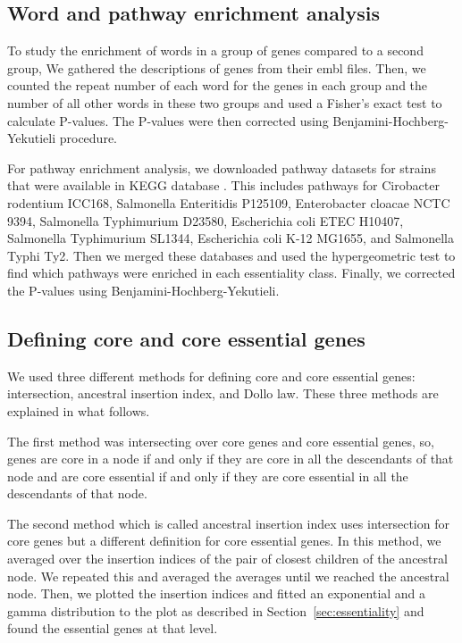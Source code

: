 \documentclass[12pt,letterpaper]{article}
\begin{document}
\subsection{Word and pathway enrichment analysis}\label{sec:enrichment}
To study the enrichment of words in a group of genes compared to a second group, We gathered the descriptions of genes from their embl files. Then, we counted the repeat number of each word for the genes in each group and the number of all other words in these two groups and used a Fisher's exact test to calculate P-values. The P-values were then corrected using Benjamini-Hochberg-Yekutieli procedure.

For pathway enrichment analysis, we downloaded pathway datasets for strains that were available in KEGG database \cite{kanehisa_kegg:_2000}. This includes pathways for Cirobacter rodentium ICC168, Salmonella Enteritidis P125109, Enterobacter cloacae NCTC 9394, Salmonella Typhimurium D23580, Escherichia coli ETEC H10407, Salmonella Typhimurium SL1344, Escherichia coli K-12 MG1655, and Salmonella Typhi Ty2. Then we merged these databases and used the hypergeometric test to find which pathways were enriched in each essentiality class. Finally, we corrected the P-values using Benjamini-Hochberg-Yekutieli.

\subsection{Defining core and core essential genes}\label{sec:core}
We used three different methods for defining core and core essential genes: intersection, ancestral insertion index, and Dollo law. These three methods are explained in what follows.

The first method was intersecting over core genes and core essential genes, so, genes are core in a node if and only if they are core in all the descendants of that node and are core essential if and only if they are core essential in all the descendants of that node.

The second method which is called ancestral insertion index uses intersection for core genes but a different definition for core essential genes. In this method, we averaged over the insertion indices of the pair of closest children of the ancestral node. We repeated this and averaged the averages until we reached the ancestral node. Then, we plotted the insertion indices and fitted an exponential and a gamma distribution to the plot as described in Section~\ref{sec:essentiality} and found the essential genes at that level.
\end{document}
